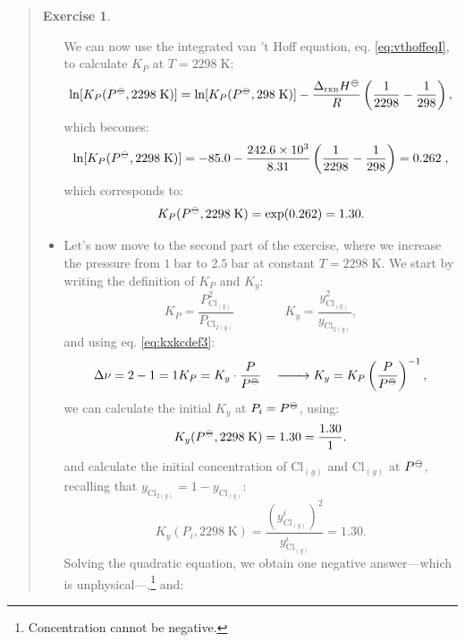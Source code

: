 \documentclass[
]{book}
\theoremstyle{definition}
\theoremstyle{definition}
\theoremstyle{definition}
\newtheorem{exercise}{Exercise}[chapter]
\theoremstyle{remark}
\begin{document}
\begin{quote}
\begin{exercise}
\begin{itemize}
  We can now use the integrated van 't Hoff equation, eq. \eqref{eq:vthoffeqI}, to calculate \(K_P\) at \(T=2298\;\text{K}\):
  \begin{equation}
  \ln [K_P (P^{-\kern-6pt{\ominus}\kern-6pt-},2298\;\text{K})] = \ln [K_P (P^{-\kern-6pt{\ominus}\kern-6pt-},298\;\text{K})] -\frac{\Delta_{\text{rxn}} H^{-\kern-6pt{\ominus}\kern-6pt-}}{R} \left(\frac{1}{2298}-\frac{1}{298} \right),
  \end{equation}
  which becomes:
  \begin{equation}
  \ln [K_P (P^{-\kern-6pt{\ominus}\kern-6pt-},2298\;\text{K})] = - 85.0 -\frac{242.6\times 10^{3}}{8.31} \left(\frac{1}{2298}-\frac{1}{298} \right) = 0.262\;,
  \end{equation}
  which corresponds to:
  \begin{equation}
  K_P (P^{-\kern-6pt{\ominus}\kern-6pt-},2298\;\text{K}) = \exp (0.262)=1.30.
  \end{equation}
\item
  Let's now move to the second part of the exercise, where we increase the pressure from \(1\;\text{bar}\) to \(2.5\;\text{bar}\) at constant \(T=2298\;\text{K}\). We start by writing the definition of \(K_P\) and \(K_y\):
  \begin{equation}
  K_P=\frac{P_\mathrm{Cl_{(g)}}^2}{P_{\mathrm{Cl}_{2(g)}}} \qquad \qquad  K_y=\frac{y_\mathrm{Cl_{(g)}}^2}{y_{\mathrm{Cl}_{2(g)}}},
  \end{equation}
  and using eq. \eqref{eq:kxkcdef3}:
  \begin{equation}
  \Delta \nu = 2 - 1 = 1 \\
  K_P = K_y \cdot \frac{P}{P^{-\kern-6pt{\ominus}\kern-6pt-}} \quad \xrightarrow \qquad K_y=K_P \left( \frac{P}{P^{-\kern-6pt{\ominus}\kern-6pt-}} \right)^{-1},
  \end{equation}
  we can calculate the initial \(K_y\) at \(P_i=P^{-\kern-6pt{\ominus}\kern-6pt-}\), using:
  \begin{equation}
  K_y (P^{-\kern-6pt{\ominus}\kern-6pt-},2298\;\text{K}) = 1.30 =\frac{1.30}{1}.
  \end{equation}
  and calculate the initial concentration of \(\mathrm{Cl}_{(g)}\) and \(\mathrm{Cl}_{(g)}\) at \(P^{-\kern-6pt{\ominus}\kern-6pt-}\), recalling that \(y_{\mathrm{Cl}_{2(g)}}=1-y_{\mathrm{Cl}_{(g)}}:\)
  \begin{equation}
  K_y (P_i,2298\;\text{K})=\frac{\left(y^i_{\mathrm{Cl}_{(g)}}\right)^2}{y^i_{\mathrm{Cl}_{(g)}}} = 1.30.
  \end{equation}
  Solving the quadratic equation, we obtain one negative answer---which is unphysical---,\footnote{Concentration cannot be negative.} and:

\end{itemize}
\end{exercise}
\end{quote}
\end{document}
